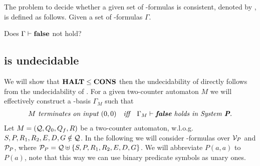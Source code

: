 \begin{definition}\label{def.3.4}
	The problem to decide whether a given set of \SysP-formulas is consistent, denoted by \PCons, is defined as follows.
	Given a set of \SysP-formulas $\Gamma$. 
	\begin{center}
		Does $\Gamma\vdash\textbf{false}$ not hold?
	\end{center}
\end{definition}
\subsection{\PCons{} is undecidable}
We will show that $\textbf{HALT}\leq\textbf{CONS}$ then the undecidability of \PCons{} directly follows from the undecidability of \autHalt. For a given two-counter automaton $M$ we will effectively construct a \SysP-basis $\Gamma_M$ such that
\begin{align*}
 & \textit{$M$ terminates on input $(0,0)$} &   & \textit{iff} & \textit{$\Gamma_M\vdash\textbf{false}$ holds in System \textbf{P}.} 
\end{align*}
Let $M=(\mathcal{Q},Q_0,Q_f,R)$ be a two-counter automaton, w.l.o.g. $S,P,R_1,R_2,E,D,G\notin\mathcal{Q}$. In the following we will consider \SysP-formulas over $\mathcal{V}_P$ and $\mathcal{P}_P$, where $\mathcal{P}_P=\mathcal{Q}\uplus\{S,P,R_1,R_2,E,D,G\}$. We will abbreviate $P(a,a)$ to $P(a)$, note that this way we can use binary predicate symbols as unary ones.

